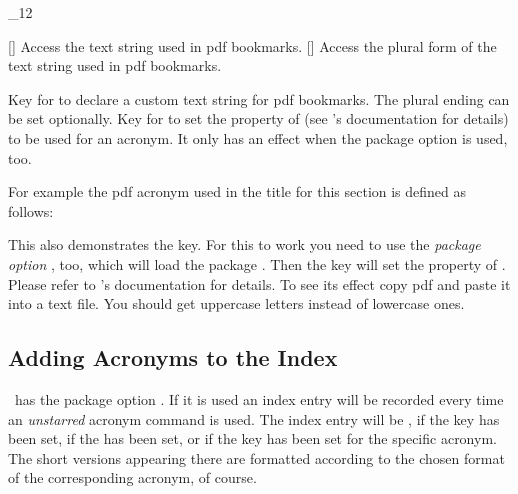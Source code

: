 \documentclass[load-preamble+,scrartcl={DIV10}]{cnltx-doc}
\makeatletter
\renewenvironment{commands}
  {%
    \cnltx@set@catcode_{12}%
    \let\command\cnltx@command
    \cnltxlist
  }
  {\endcnltxlist}
\makeatother
\begin{document}
\begin{commands}
  \command{acpdfstring}[]
    Access the text string used in \acs{pdf} bookmarks.
  \command{acpdfstringplural}[]
    Access the plural form of the text string used in \acs{pdf} bookmarks.
\end{commands}
\begin{options}
    Key for  to declare a custom text string for \acs{pdf}
    bookmarks.  The plural ending can be set optionally.
    Key for  to set the 
    property of  (see 's documentation for
    details) to be used for an acronym.  It only has an effect when the
    package option  is used, too.
\end{options}
  
For example the \acs{pdf} acronym used in the title for this section is defined
as follows:
\begin{sourcecode}
\end{sourcecode}
 
This also demonstrates the  key.  For this to work you need to
use the \emph{package option} , too, which will load the
package .  Then the key  will set the
 property of .  Please refer to
's documentation for details.  To see its effect copy \ac{pdf}
and paste it into a text file.  You should get uppercase letters instead of
lowercase ones.

\subsection{Adding Acronyms to the Index}\label{ssec:index}
\noindent{}\acro\ has the package option .  If it is
used an index entry will be recorded every time an \emph{unstarred} acronym
command is used.  The index entry will be ,
 if the  key has been set,
 if the  has been set,
or  if the key  has been set for the specific
acronym.  The short versions appearing there are formatted according to the
chosen format of the corresponding acronym, of course.
\end{document}
